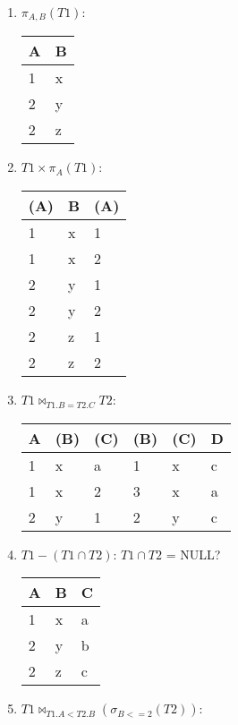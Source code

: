 \documentclass{article}
\begin{document}
\begin{enumerate}
    \item $\pi_{A,B}(T1)$: 
    
\begin{table}[!h] \centering
\begin{tabular}{|l|l|}
\hline
\textbf{A} & \textbf{B} \\ \hline
1          & x          \\ \hline
2          & y          \\ \hline
2          & z          \\ \hline
\end{tabular}
\end{table}
    \item $T1 \times \pi _A(T1)$:    
\begin{table}[!h] \centering
\begin{tabular}{|l|l|l|}
 \hline
\textbf{(A)} & \textbf{B} & \textbf{(A)} \\ \hline
1   & x & 1   \\ \hline
1   & x & 2   \\ \hline
2   & y & 1   \\ \hline
2   & y & 2   \\ \hline
2   & z & 1   \\ \hline
2   & z & 2  \\ \hline
\end{tabular}
\end{table}
    \item $T1 \bowtie_{T1.B=T2.C} T2$: 
    
\begin{table}[!h] \centering
\begin{tabular}{|l|l|l|l|l|l|}
\hline
\textbf{A} & \textbf{(B)} & \textbf{(C)} & \textbf{(B)} & \textbf{(C)} & \textbf{D} \\ \hline
1          & x            & a            & 1   & x   & c \\ \hline
1          & x            & 2            & 3   & x   & a \\ \hline
2          & y            & 1            & 2   & y   & c \\ \hline
\end{tabular}
\end{table}
    \item $T1 - (T1 \cap T2)$:  
    \color{red} $T1 \cap T2$ = NULL?
    \color{black}
\begin{table}[!h] \centering
\begin{tabular}{|l|l|l|}
\hline
\textbf{A} & \textbf{B} & \textbf{C} \\ \hline
1          & x          & a          \\ \hline
2          & y          & b          \\ \hline
2          & z          & c          \\ \hline
\end{tabular}
\end{table}
    \item $T1 \bowtie_{T1.A < T2.B} (\sigma_{B<=2}(T2))$: 
    

\end{enumerate}
\end{document}
